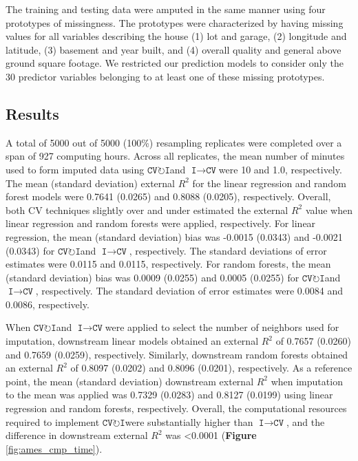 \documentclass[AMA,STIX1COL,doublespace]{WileyNJD-v2}
\begin{document}
The training and testing data were amputed in the same manner using four
prototypes of missingness. The prototypes were characterized by having
missing values for all variables describing the house (1) lot and
garage, (2) longitude and latitude, (3) basement and year built, and (4)
overall quality and general above ground square footage. We restricted
our prediction models to consider only the 30 predictor variables
belonging to at least one of these missing prototypes.

\subsection{Results}

A total of 5000 out of 5000 (100\%) resampling replicates were completed
over a span of 927 computing hours. Across all replicates, the mean
number of minutes used to form imputed data using
$\texttt{CV}\!\circlearrowright\!\texttt{I}$\space and
$\texttt{I}\!\!\rightarrow\!\texttt{CV}$\space were 10 and 1.0,
respectively. The mean (standard deviation) external \(R^2\) for the
linear regression and random forest models were 0.7641 (0.0265) and
0.8088 (0.0205), respectively. Overall, both CV techniques slightly over
and under estimated the external \(R^2\) value when linear regression
and random forests were applied, respectively. For linear regression,
the mean (standard deviation) bias was -0.0015 (0.0343) and -0.0021
(0.0343) for $\texttt{CV}\!\circlearrowright\!\texttt{I}$\space and
$\texttt{I}\!\!\rightarrow\!\texttt{CV}$, respectively. The standard
deviations of error estimates were 0.0115 and 0.0115, respectively. For
random forests, the mean (standard deviation) bias was 0.0009 (0.0255)
and 0.0005 (0.0255) for
$\texttt{CV}\!\circlearrowright\!\texttt{I}$\space and
$\texttt{I}\!\!\rightarrow\!\texttt{CV}$, respectively. The standard
deviation of error estimates were 0.0084 and 0.0086, respectively.

When $\texttt{CV}\!\circlearrowright\!\texttt{I}$\space and
$\texttt{I}\!\!\rightarrow\!\texttt{CV}$\space were applied to select
the number of neighbors used for imputation, downstream linear models
obtained an external \(R^2\) of 0.7657 (0.0260) and 0.7659 (0.0259),
respectively. Similarly, downstream random forests obtained an external
\(R^2\) of 0.8097 (0.0202) and 0.8096 (0.0201), respectively. As a
reference point, the mean (standard deviation) downstream external
\(R^2\) when imputation to the mean was applied was 0.7329 (0.0283) and
0.8127 (0.0199) using linear regression and random forests,
respectively. Overall, the computational resources required to implement
$\texttt{CV}\!\circlearrowright\!\texttt{I}$\space were substantially
higher than $\texttt{I}\!\!\rightarrow\!\texttt{CV}$\space, and the
difference in downstream external \(R^2\) was \textless0.0001
(\textbf{Figure} \ref{fig:ames_cmp_time}).
\end{document}
